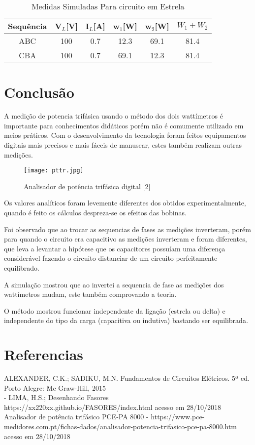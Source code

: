 \documentclass[a4paper, 12pt]{article}
\begin{document}
	\begin{table}[H]
		\centering
		\begin{tabular}{|c|c|c|c|c|c|}
			\hline %
			Sequência & V$_L$[V] & I$_L$[A] & w$_1$[W] & w$_2$[W] & $W_1 + W_2$ \\
			\hline %
			ABC & 100 & 0.7 & 12.3 & 69.1 & 81.4     \\
			\hline %
			CBA & 100 & 0.7 & 69.1 & 12.3 & 81.4     \\
			\hline %
		\end{tabular}
		\caption{Medidas Simuladas Para circuito em Estrela}
	\end{table}
	
	
	
	
	
	
	\newpage
	\section{Conclusão}
	\justifying
	A medição de potencia trifásica usando o método dos dois wattímetros é importante para conhecimentos didáticos porém não é comumente utilizado em meios práticos. Com o desenvolvimento da tecnologia foram feitos equipamentos digitais mais precisos e mais fáceis de manusear, estes também realizam outras medições.
	\begin{figure}[H]
		\centering %
		\texttt{[image: pttr.jpg]}
		\caption{Analisador de potência trifásica digital [2]}
	\end{figure}
	
	Os valores analíticos foram levemente diferentes dos obtidos experimentalmente, quando é feito os cálculos despreza-se os efeitos das bobinas.
	
	Foi observado que ao trocar as sequencias de fases as medições inverteram, porém para quando o circuito era capacitivo as medições inverteram e  foram diferentes, que leva a levantar a hipótese que os capacitores possuíam uma diferença considerável  fazendo o circuito distanciar de um circuito perfeitamente equilibrado.
	
	A simulação mostrou que ao invertei a sequencia de fase as medições dos wattímetros mudam, este também comprovando a teoria.
	
	O método mostrou funcionar independente da ligação (estrela ou delta) e independente do tipo da carga (capacitiva ou indutiva) bastando ser equilibrada.
	
	\newpage
	\section*{Referencias}
	\justifying
	\noindent
	ALEXANDER, C.K.; SADIKU, M.N. Fundamentos de Circuitos Elétricos. 5ª ed.
	Porto Alegre: Mc Graw-Hill, 2015\\
	
	\noindent
	[1] - LIMA, H.S.; Desenhando Fasores https://xx220xx.github.io/FASORES/index.html acesso em 28/10/2018 \\
	
	\noindent
	[2] Analisador de potência trifásico PCE-PA 8000 - https://www.pce-medidores.com.pt/fichas-dados/analisador-potencia-trifasico-pce-pa-8000.htm acesso em 28/10/2018
\end{document}
